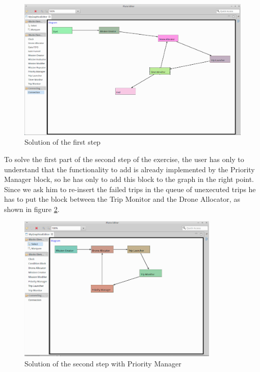 \begin{figure}[htb]
  \centering
  \includegraphics[width=\linewidth]{pictures/EditorScreen.png}
  \caption{Solution of the first step}
  \label{fig:firstStep}
\end{figure}

\newpage

To solve the first part of the second step of the exercise, the user has only to understand that the functionality to add is already implemented by the Priority Manager block, so he has only to add this block to the graph in the right point.
Since we ask him to re-insert the failed trips in the queue of unexecuted trips he has to put the block between the Trip Monitor and the Drone Allocator, as shown in figure \ref{fig:secondStepPriority}.

\begin{figure}[htb]
  \centering
  \includegraphics[width=\linewidth,height=7cm]{pictures/secondStep.png}
  \caption{Solution of the second step with Priority Manager}
  \label{fig:secondStepPriority}
\end{figure}

